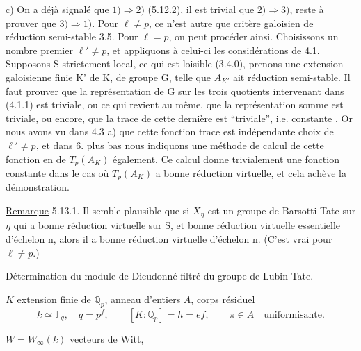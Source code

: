 c) On a déjà signalé que $1)\Rightarrow2)$ (5.12.2), il est trivial que $2)\Rightarrow3)$, reste à prouver que $3)\Rightarrow1)$. Pour $\ell\ne p$, ce n'est autre que  critère galoisien de réduction semi-stable 3.5. Pour $\ell=p$, on peut procéder ainsi. Choisissons un nombre premier $\ell'\ne p$, et appliquons à celui-ci les considérations de 4.1.  Supposons S strictement local, ce qui est loisible (3.4.0), prenons une extension galoisienne finie K' de K, de groupe G, telle que $A_{K'}$ ait réduction semi-stable. Il faut prouver que la représentation de G sur les trois quotients intervenant dans (4.1.1) est triviale, ou ce qui revient au même, que la  représentation somme est triviale, ou encore, que la trace de cette dernière est ``triviale'', i.e. constante . Or nous avons vu dans 4.3 a) que cette fonction trace est indépendante  choix de $\ell'\ne p$, et dans 6. plus bas nous indiquons une méthode de calcul de cette fonction en  de $T_p(A_K)$ également. Ce calcul donne trivialement une fonction constante dans le cas où $T_p(A_K)$ a bonne réduction virtuelle, et cela achève la démonstration.

\uline{Remarque} 5.13.1. Il semble plausible que si $X_\eta$ est un  groupe de Barsotti-Tate sur $\eta$ qui a bonne réduction virtuelle sur S, et bonne réduction virtuelle essentielle d'échelon n, alors il a bonne réduction virtuelle d'échelon n. (C'est  vrai pour $\ell\ne p$.)

Détermination du module de Dieudonné filtré du groupe de Lubin-Tate.

$K$ extension finie de $\mathbb Q_p$, anneau d'entiers $A$, corps résiduel
\[
k\simeq\mathbb F_q,\quad q=p^f,\qquad [K:\mathbb Q_p]=h=ef,\qquad \pi\in A\quad\text{uniformisante}.
\]

$W=W_\infty(k)$ vecteurs de Witt,

